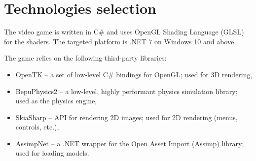 \section{Technologies selection}
The video game is written in C\# and uses OpenGL Shading Language (GLSL) for the shaders.
The targeted platform is .NET 7 on Windows 10 and above.

The game relies on the following third-party libraries:
\begin{itemize}
    \item OpenTK -- a set of low-level C\# bindings for OpenGL; used for 3D rendering,
    \item BepuPhysics2 -- a low-level, highly performant physics simulation library; used as the physics engine,
    \item SkiaSharp -- API for rendering 2D images; used for 2D rendering (menus, controls, etc.),
    \item AssimpNet -- a .NET wrapper for the Open Asset Import (Assimp) library; used for loading models.
\end{itemize}